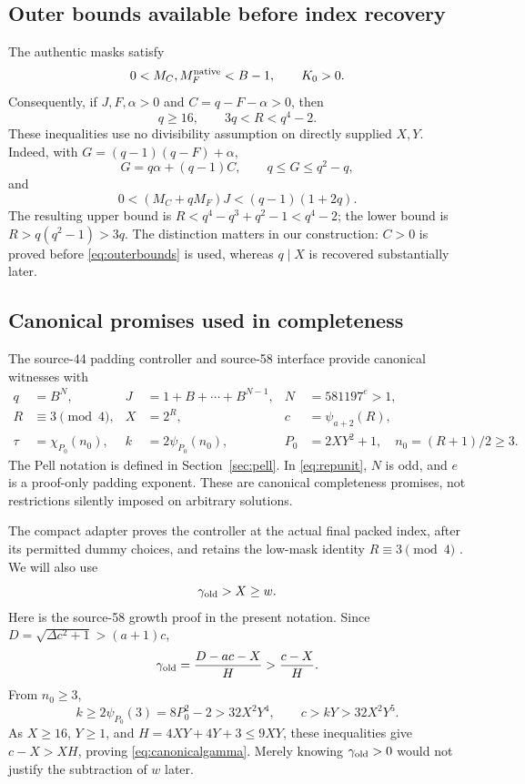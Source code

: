 \documentclass[11pt,a4paper]{article}
\theoremstyle{definition}
\theoremstyle{remark}
\begin{document}
\subsection{Outer bounds available before index recovery}
\label{sec:outer}

The authentic masks satisfy
\[
 0<M_C,M_F^{\rm native}<B-1,\qquad K_0>0.
\]
Consequently, if \(J,F,\alpha>0\) and \(C=q-F-\alpha>0\), then
\begin{equation}
 q\ge16,\qquad 3q<R<q^4-2.                 \label{eq:outerbounds}
\end{equation}
These inequalities use no divisibility assumption on directly supplied
\(X,Y\). Indeed, with \(G=(q-1)(q-F)+\alpha\),
\[
 G=q\alpha+(q-1)C,\qquad q\le G\le q^2-q,
\]
and
\[
 0<(M_C+qM_F)J<(q-1)(1+2q).
\]
The resulting upper bound is
\(R<q^4-q^3+q^2-1<q^4-2\); the lower bound is
\(R>q(q^2-1)>3q\). The distinction matters in our construction:
\(C>0\) is proved before \eqref{eq:outerbounds} is used, whereas
\(q\mid X\) is recovered substantially later.

\subsection{Canonical promises used in completeness}
\label{sec:canonical}

The source-44 padding controller and source-58 interface provide canonical
witnesses with
\begin{align}
 q&=B^N,& J&=1+B+\cdots+B^{N-1},&
 N&=581197^e>1,                              \label{eq:repunit}\\
 R&\equiv3\pmod4,& X&=2^R,&
 c&=\psi_{a+2}(R),                            \label{eq:canonicalR}\\
 \tau&=\chi_{P_0}(n_0),&
 k&=2\psi_{P_0}(n_0),&
 P_0&=2XY^2+1,\quad n_0=(R+1)/2\ge3.          \label{eq:canonicalpell}
\end{align}
The Pell notation is defined in Section~\ref{sec:pell}.
In \eqref{eq:repunit}, \(N\) is odd, and \(e\) is a proof-only padding
exponent. These are canonical completeness promises, not restrictions
silently imposed on arbitrary solutions.

The compact adapter proves the controller at the actual final packed
index, after its permitted dummy choices, and retains the low-mask
identity \(R\equiv3\pmod4\) \cite[Section 6]{source44}.
We will also use
\begin{equation}
 \gamma_{\rm old}>X\ge w.                    \label{eq:canonicalgamma}
\end{equation}
Here is the source-58 growth proof in the present notation.
Since \(D=\sqrt{\Delta c^2+1}>(a+1)c\),
\[
 \gamma_{\rm old}=\frac{D-ac-X}{H}>\frac{c-X}{H}.
\]
From \(n_0\ge3\),
\[
 k\ge2\psi_{P_0}(3)=8P_0^2-2>32X^2Y^4,\qquad
 c>kY>32X^2Y^5.
\]
As \(X\ge16\), \(Y\ge1\), and \(H=4XY+4Y+3\le9XY\), these inequalities
give \(c-X>XH\), proving \eqref{eq:canonicalgamma}. Merely knowing
\(\gamma_{\rm old}>0\) would not justify the subtraction of \(w\) later.
\end{document}
